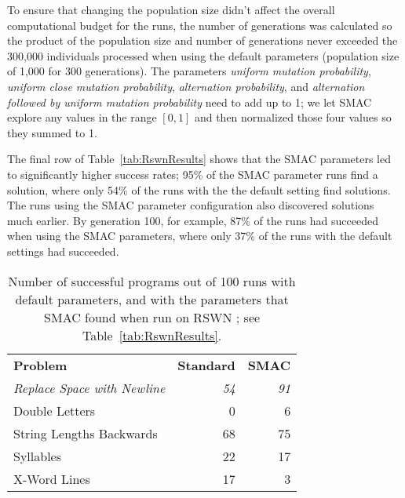 To ensure that changing the population size didn't affect the overall
computational budget for the runs, the number of generations was calculated
so the product of the population size and
number of generations never exceeded the 300,000 individuals processed when using the default parameters
(population size of 1,000 for 300 generations).
The parameters \textit{uniform mutation probability}, \textit{uniform close
mutation probability}, \textit{alternation probability}, and \textit{alternation followed by uniform mutation probability} need to add up
to 1; we let SMAC explore any values in the range $[0, 1]$ and then normalized
those four values so they summed to 1.


The final row of Table~\ref{tab:RswnResults} shows that the SMAC parameters
led to significantly higher success rates; 95\% of
the SMAC parameter runs find a solution, where only 54\% of the runs with the
the default setting find solutions.
The runs using the SMAC
parameter configuration also discovered solutions much earlier. By generation 100, for example, 87\% of the runs had succeeded when using the SMAC parameters, 
where only 37\% of the runs with the default settings
had succeeded.

\begin{table}[t]
	\centering
	\caption{Number of successful programs out of 100 runs with default parameters, and with the parameters that SMAC found when run on RSWN
		; see Table~\ref{tab:RswnResults}.}
	\label{table:allResults}
	\begin{tabular}{l r r}
		\textbf{Problem} & \textbf{Standard} & \textbf{SMAC} \\
		\textit{Replace Space with Newline} & \textit{54} & \textit{91} \\
		Double Letters	& 0 & 6 \\
		String Lengths Backwards & 68 & 75 \\
		Syllables & 22 & 17 \\
		X-Word Lines & 17 & 3 \\
		\bottomrule
	\end{tabular}
\end{table}

